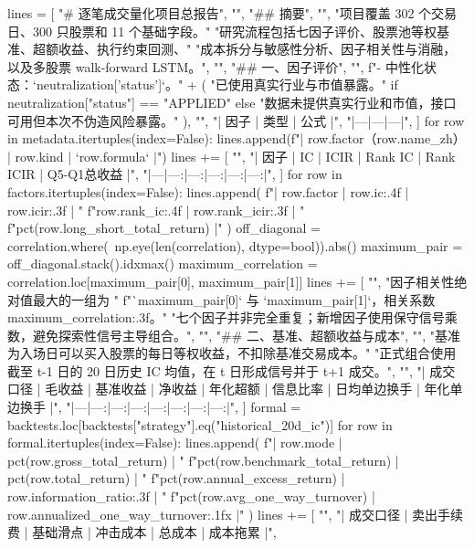 \documentclass[UTF8,a4paper,fontset=fandol]{ctexart}
\begin{document}
\begin{ProjectCode}
{    lines = [
        "# 逐笔成交量化项目总报告",
        "",
        "## 摘要",
        "",
        "项目覆盖 302 个交易日、300 只股票和 11 个基础字段。"
        "研究流程包括七因子评价、股票池等权基准、超额收益、执行约束回测、"
        "成本拆分与敏感性分析、因子相关性与消融，以及多股票 walk-forward LSTM。",
        "",
        "## 一、因子评价",
        "",
        f"- 中性化状态：`{neutralization['status']}`。"
        + (
            "已使用真实行业与市值暴露。"
            if neutralization["status"] == "APPLIED"
            else "数据未提供真实行业和市值，接口可用但本次不伪造风险暴露。"
        ),
        "",
        "| 因子 | 类型 | 公式 |",
        "|---|---|---|",
    ]
    for row in metadata.itertuples(index=False):
        lines.append(f"| {row.factor}（{row.name_zh}） | {row.kind} | `{row.formula}` |")
    lines += [
        "",
        "| 因子 | IC | ICIR | Rank IC | Rank ICIR | Q5-Q1总收益 |",
        "|---|---:|---:|---:|---:|---:|",
    ]
    for row in factors.itertuples(index=False):
        lines.append(
            f"| {row.factor} | {row.ic:.4f} | {row.icir:.3f} | "
            f"{row.rank_ic:.4f} | {row.rank_icir:.3f} | "
            f"{pct(row.long_short_total_return)} |"
        )
    off_diagonal = correlation.where(~np.eye(len(correlation), dtype=bool)).abs()
    maximum_pair = off_diagonal.stack().idxmax()
    maximum_correlation = correlation.loc[maximum_pair[0], maximum_pair[1]]
    lines += [
        "",
        "因子相关性绝对值最大的一组为 "
        f"`{maximum_pair[0]}` 与 `{maximum_pair[1]}`，相关系数 {maximum_correlation:.3f}。"
        "七个因子并非完全重复；新增因子使用保守信号乘数，避免探索性信号主导组合。",
        "",
        "## 二、基准、超额收益与成本",
        "",
        "基准为入场日可以买入股票的每日等权收益，不扣除基准交易成本。"
        "正式组合使用截至 t-1 日的 20 日历史 IC 均值，在 t 日形成信号并于 t+1 成交。",
        "",
        "| 成交口径 | 毛收益 | 基准收益 | 净收益 | 年化超额 | 信息比率 | 日均单边换手 | 年化单边换手 |",
        "|---|---:|---:|---:|---:|---:|---:|---:|",
    ]
    formal = backtests.loc[backtests["strategy"].eq("historical_20d_ic")]
    for row in formal.itertuples(index=False):
        lines.append(
            f"| {row.mode} | {pct(row.gross_total_return)} | "
            f"{pct(row.benchmark_total_return)} | {pct(row.total_return)} | "
            f"{pct(row.annual_excess_return)} | {row.information_ratio:.3f} | "
            f"{pct(row.avg_one_way_turnover)} | {row.annualized_one_way_turnover:.1f}x |"
        )
    lines += [
        "",
        "| 成交口径 | 卖出手续费 | 基础滑点 | 冲击成本 | 总成本 | 成本拖累 |",
}
\end{ProjectCode}
\end{document}
